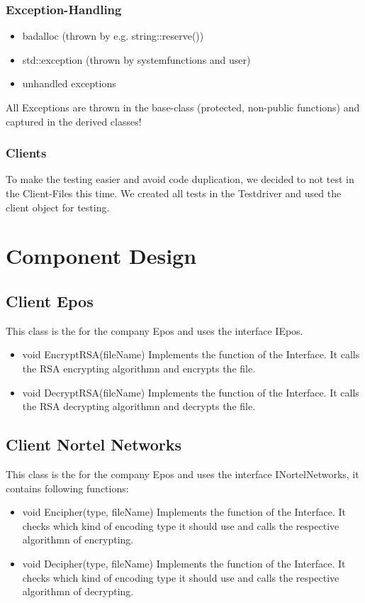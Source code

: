 \subsubsection{Exception-Handling}
\begin{itemize}
	\item badalloc (thrown by e.g. string::reserve())
	\item std::exception (thrown by systemfunctions and user)
	\item unhandled exceptions
\end{itemize}
All Exceptions are thrown in the base-class (protected, non-public functions) and captured in the derived classes!

\subsubsection{Clients}
 To make the testing easier and avoid code duplication, we decided to not test in the Client-Files this time. We created all tests in the Testdriver and used the client object for testing.
	
\section{Component Design}
\subsection{Client Epos}
This class is the for the company Epos and uses the interface IEpos.
\begin{itemize}
\item void EncryptRSA(fileName)
\subitem Implements the function of the Interface. It calls the RSA encrypting algorithmn and encrypts the file.
\item void DecryptRSA(fileName)
\subitem Implements the function of the Interface. It calls the RSA decrypting algorithmn and decrypts the file.
\end{itemize}

\subsection{Client Nortel Networks}
This class is the for the company Epos and uses the interface INortelNetworks, it contains following functions:
\begin{itemize}
\item void Encipher(type, fileName)
\subitem Implements the function of the Interface. It checks which kind of encoding type it should use and calls
the respective algorithmn of encrypting.
\item void Decipher(type, fileName)
\subitem Implements the function of the Interface. It checks which kind of encoding type it should use and calls
the respective algorithmn of decrypting.
\end{itemize}

